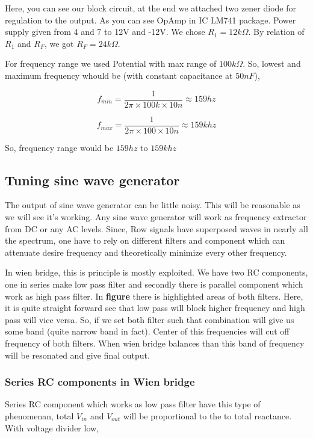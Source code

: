 \documentclass[14pt,a4paper]{extarticle}
\begin{document}
Here, you can see our block circuit, at the end we attached two zener diode for regulation to the output. As you can see OpAmp in IC LM741 package. Power supply given from  4 and 7 to 12V and -12V. We chose \(R_{1}=12k\Omega\). By relation of \(R_{1}\) and \(R_{F}\), we got \(R_{F}=24k\Omega\).

For frequency range we used Potential with max range of \(100k\Omega\). So, lowest and maximum frequency whould be (with constant capacitance at \(50nF\)),

\begin{equation*}
\label{eq:org284eb02}
  f_{min} = \frac{1}{2\pi\times100k\times 10n} \approx 159 hz
\end{equation*}

\begin{equation*}
\label{eq:orgc56dc93}
  f_{max} = \frac{1}{2\pi\times100\times 10n} \approx 159k hz
\end{equation*}

So, frequency range would be \(159 hz\) to \(159k hz\)

\subsection{Tuning sine wave generator}
\label{sec:org696290c}

The output of sine wave generator can be little noisy. This will be reasonable as we will see it's working. Any sine wave generator will work as frequency extractor from DC or any AC levels. Since, Row signals have superposed waves in nearly all the spectrum, one have to rely on different filters and component which can attenuate desire frequency and theoretically minimize every other frequency. 


In wien bridge, this is principle is mostly exploited. We have two RC components, one in series make low pass filter and secondly there is parallel component which work as high pass filter. In \textbf{\textbf{figure}} there is highlighted areas of both filters. Here, it is quite straight forward see that low pass will block higher frequency and high pass will vice versa. So, if we set both filter such that combination will give us some band (quite narrow band in fact). Center of this frequencies will cut off frequency of both filters. When wien bridge balances than this band of frequency will be resonated and give final output.

\subsubsection{Series RC components in Wien bridge}
\label{sec:org39fd4f2}
Series RC component which works as low pass filter have this type of phenomenan, total \(V_{in}\) and \(V_{out}\) will be proportional to the to total reactance. With voltage divider low, 
\end{document}
